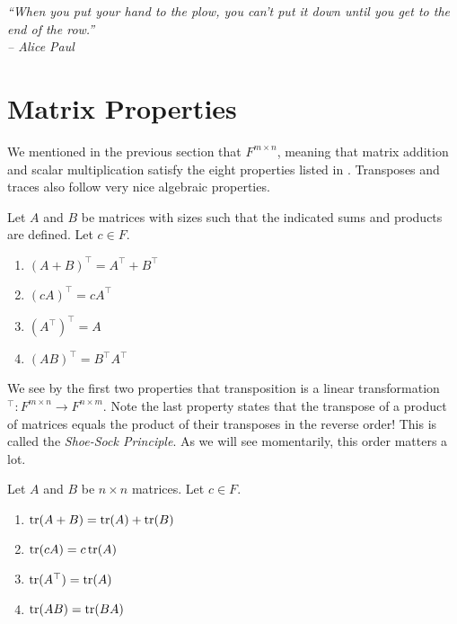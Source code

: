 
\begin{center} 
\emph{``When you put your hand to the plow, you can't put it down until you get to the end of the row.''\\ -- Alice Paul}
\end{center}

\section{Matrix Properties}\label{sec:rowspace}
We mentioned in the previous section that $F^{m \times n}$, meaning that matrix addition and scalar multiplication satisfy the eight properties listed in . Transposes and traces also follow very nice algebraic properties.\\

\begin{Thm}  Let $A$ and $B$ be matrices with sizes such that the indicated sums and products are defined. Let $c\in F$.
\begin{multicols}{2}
\begin{enumerate}[!THM!, start=1]
\item $(A+B)^\top  = A^\top  + B^\top $\\
\item $(cA)^\top  = cA^\top $\\
\item $(A^\top )^\top  = A$\\
\item $(AB)^\top  = B^\top A^\top $\\
\end{enumerate}
\end{multicols}
\end{Thm}\vspace{-0.15 in}

We see by the first two properties that transposition is a linear transformation $\mbox{}^\top  : F^{m\times n} \to F^{n\times m}$. Note the last property states that the transpose of a product of matrices equals the product of their transposes in the reverse order! This is called the \emph{Shoe-Sock Principle}\footnotemark[2]. As we will see momentarily, this order matters a lot.\\ 

\begin{Thm}  Let $A$ and $B$ be $n\times n$ matrices. Let $c\in F$.
\begin{multicols}{2}
\begin{enumerate}[!THM!, start=1]
\item $\operatorname*{tr}(A+B) = \operatorname*{tr}(A) + \operatorname*{tr}(B)$\\
\item $\operatorname*{tr}(cA) = c\operatorname*{tr}(A)$\\
\item $\operatorname*{tr}(A^\top ) = \operatorname*{tr}(A)$\\
\item $\operatorname*{tr}(AB) = \operatorname*{tr}(BA)$\\
\end{enumerate}
\end{multicols}
\end{Thm}\vspace{-0.15 in}

